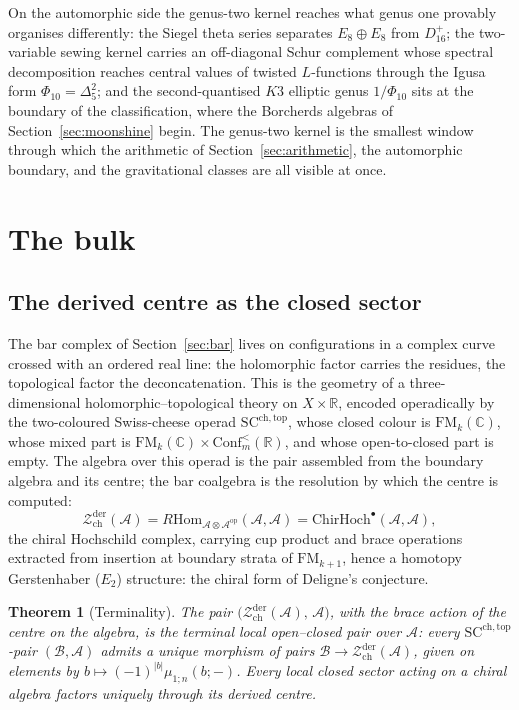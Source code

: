 \documentclass[11pt]{amsart}
\numberwithin{equation}{section}
\theoremstyle{plain}
\newtheorem{theorem}{Theorem}[section]
\theoremstyle{definition}
\theoremstyle{remark}
\newcommand{\cA}{\mathcal{A}}
\newcommand{\cB}{\mathcal{B}}
\newcommand{\cZ}{\mathcal{Z}}
\newcommand{\bC}{\mathbb{C}}
\newcommand{\bR}{\mathbb{R}}
\newcommand{\FM}{\mathrm{FM}}
\newcommand{\Conf}{\mathrm{Conf}}
\newcommand{\ChirHoch}{\mathrm{ChirHoch}}
\begin{document}
On the automorphic side the genus-two kernel reaches what genus one
provably organises differently: the Siegel theta series separates
$E_8\oplus E_8$ from $D_{16}^{+}$; the two-variable sewing kernel
carries an off-diagonal Schur complement whose spectral decomposition
reaches central values of twisted $L$-functions through the Igusa form
$\Phi_{10}=\Delta_5^{2}$; and the second-quantised $K3$ elliptic genus
$1/\Phi_{10}$ sits at the boundary of the classification, where the
Borcherds algebras of Section~\ref{sec:moonshine} begin. The
genus-two kernel is the smallest window through which the arithmetic
of Section~\ref{sec:arithmetic}, the automorphic boundary, and the
gravitational classes are all visible at once.

\section{The bulk}\label{sec:bulk}

\subsection{The derived centre as the closed sector}

The bar complex of Section~\ref{sec:bar} lives on configurations in a
complex curve crossed with an ordered real line: the holomorphic factor
carries the residues, the topological factor the deconcatenation. This is
the geometry of a three-dimensional holomorphic--topological theory on
$X\times\bR$, encoded operadically by the two-coloured Swiss-cheese operad
$\mathrm{SC}^{\mathrm{ch,top}}$, whose closed colour is $\FM_k(\bC)$,
whose mixed part is $\FM_k(\bC)\times\Conf^{<}_m(\bR)$, and whose
open-to-closed part is empty. The algebra over this operad is the pair assembled from the boundary
algebra and its centre; the bar coalgebra is the resolution by which
the centre is computed:
\begin{equation}
\cZ^{\mathrm{der}}_{\mathrm{ch}}(\cA)
=R\mathrm{Hom}_{\cA\otimes\cA^{\mathrm{op}}}(\cA,\cA)
=\ChirHoch^{\bullet}(\cA,\cA),
\end{equation}
the chiral Hochschild complex, carrying cup product and brace operations
extracted from insertion at boundary strata of $\FM_{k+1}$, hence a
homotopy Gerstenhaber ($E_2$) structure: the chiral form of Deligne's
conjecture.

\begin{theorem}[Terminality]\label{thm:terminality}
The pair
$\bigl(\cZ^{\mathrm{der}}_{\mathrm{ch}}(\cA),\,\cA\bigr)$, with the brace
action of the centre on the algebra, is the terminal local open--closed
pair over $\cA$: every $\mathrm{SC}^{\mathrm{ch,top}}$-pair
$(\cB,\cA)$ admits a unique morphism of pairs
$\cB\to\cZ^{\mathrm{der}}_{\mathrm{ch}}(\cA)$, given on elements by
$b\mapsto(-1)^{|b|}\mu_{1;n}(b;-)$. Every local closed sector acting on
a chiral algebra factors uniquely through its derived centre.
\end{theorem}
\end{document}
